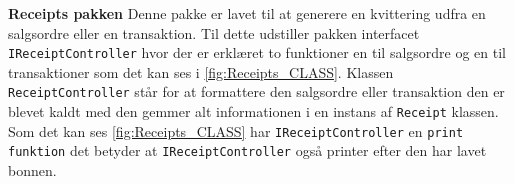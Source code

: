 \textbf{Receipts pakken}
\newline
Denne pakke er lavet til at generere en kvittering udfra en salgsordre eller en transaktion.
Til dette udstiller pakken interfacet \texttt{IReceiptController} hvor der er erklæret to funktioner en til salgsordre og en til transaktioner som det kan ses i \ref{fig:Receipts_CLASS}.
Klassen \texttt{ReceiptController} står for at formattere den salgsordre eller transaktion den er blevet kaldt med den gemmer alt informationen i en instans af \texttt{Receipt} klassen.
Som det kan ses \ref{fig:Receipts_CLASS} har \texttt{IReceiptController} en \texttt{print funktion} det betyder at \texttt{IReceiptController} også printer efter den har lavet bonnen.



